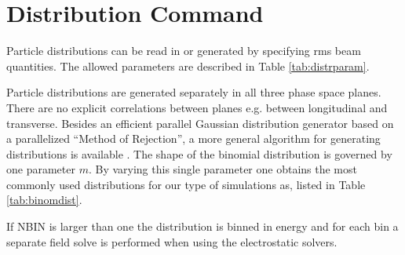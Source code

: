 \chapter{Distribution Command}
\label{sec:distribution}
Particle distributions can be read in or generated by specifying rms beam quantities.
The allowed parameters are described in Table \ref{tab:distrparam}.

Particle distributions are generated separately in all three phase space planes.
There are no explicit correlations between planes e.g. between longitudinal and transverse.
Besides an efficient parallel Gaussian distribution generator based on a parallelized 
``Method of Rejection'',
a more general algorithm for generating
distributions is available \cite{JohoDist}. The shape of the binomial distribution is governed by
one parameter $m$. By varying this single parameter one obtains the most commonly 
used distributions for our
type of simulations as, listed in Table \ref{tab:binomdist}.

If NBIN is larger than one the distribution is binned in energy and for each bin a separate field solve is
performed when using the electrostatic solvers.
 
